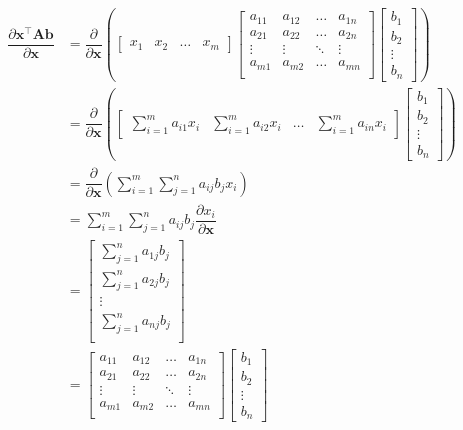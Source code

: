 \documentclass{article}
\newcommand{\trans}{\top}
\begin{document}
\begin{align}
    \dfrac{\partial \mathbf{x}^\trans \mathbf{A} \mathbf{b}}{\partial \mathbf{x}} &= \dfrac{\partial}{\partial \mathbf{x}} \left(
    \begin{bmatrix}
        x_{1} & x_{2} & \dots & x_{m}
    \end{bmatrix}
    \begin{bmatrix}
        a_{11} & a_{12} & \dots & a_{1n} \\
        a_{21} & a_{22} & \dots & a_{2n} \\
        \vdots & \vdots & \ddots & \vdots \\
        a_{m1} & a_{m2} & \dots & a_{mn} \\
    \end{bmatrix} \begin{bmatrix}
        b_{1} \\ b_{2} \\ \vdots \\ b_{n}
    \end{bmatrix} \right) \\
    &= \dfrac{\partial}{\partial \mathbf{x}} \left(
			\begin{bmatrix}
				\displaystyle \sum_{i = 1}^{m} a_{i1}x_{i} & 
				\displaystyle \sum_{i = 1}^{m} a_{i2}x_{i} & 
				\dots & 
				\displaystyle \sum_{i = 1}^{m} a_{in}x_{i}
			\end{bmatrix} \begin{bmatrix}
				b_{1} \\ b_{2} \\ \vdots \\ b_{n}
			\end{bmatrix} \right) \\
    &= \dfrac{\partial}{\partial \mathbf{x}} \left(
        \sum_{i = 1}^{m}\sum_{j = 1}^{n} a_{ij} b_{j} x_{i}
    \right) \\
    &= \sum_{i = 1}^{m}\sum_{j = 1}^{n} a_{ij} b_{j} \dfrac{\partial x_{i}}{\partial \mathbf{x}} \\
    &= \begin{bmatrix}
        \sum_{j = 1}^{n} a_{1j} b_{j} \\
        \sum_{j = 1}^{n} a_{2j} b_{j} \\
        \vdots \\
        \sum_{j = 1}^{n} a_{nj} b_{j} \\
    \end{bmatrix} \\
    &= \begin{bmatrix}
        a_{11} & a_{12} & \dots & a_{1n} \\
        a_{21} & a_{22} & \dots & a_{2n} \\
        \vdots & \vdots & \ddots & \vdots \\
        a_{m1} & a_{m2} & \dots & a_{mn} \\
    \end{bmatrix}
    \begin{bmatrix}
        b_1 \\
        b_2 \\
        \vdots \\
        b_n
    \end{bmatrix}
\end{align}
\end{document}
